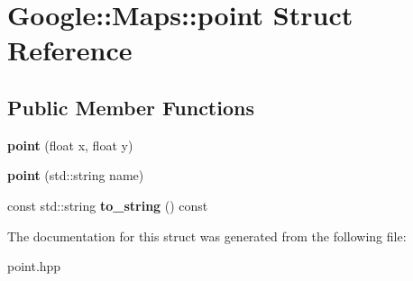 \hypertarget{structGoogle_1_1Maps_1_1point}{}\section{Google\+:\+:Maps\+:\+:point Struct Reference}
\label{structGoogle_1_1Maps_1_1point}
\subsection*{Public Member Functions}
\begin{DoxyCompactItemize}
\item 
\mbox{\label{structGoogle_1_1Maps_1_1point_abcf782dee7c73565e3db32b3d3d8c3f7}} 
{\bfseries point} (float x, float y)
\item 
\mbox{\label{structGoogle_1_1Maps_1_1point_a57f031ce9ddb5cc80eb5ec3f02ee0641}} 
{\bfseries point} (std\+::string name)
\item 
\mbox{\label{structGoogle_1_1Maps_1_1point_a9cc5bd886bee44b43dbaf9da0adb2ec3}} 
const std\+::string {\bfseries to\+\_\+string} () const
\end{DoxyCompactItemize}


The documentation for this struct was generated from the following file\+:\begin{DoxyCompactItemize}
\item 
point.\+hpp\end{DoxyCompactItemize}
